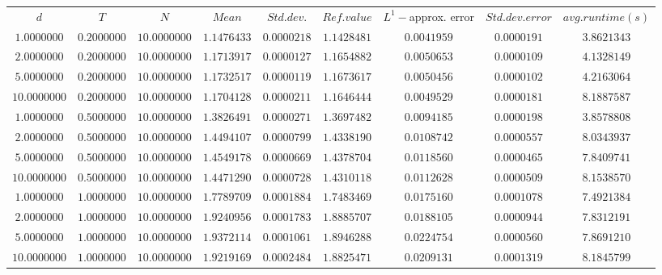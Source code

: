 \begin{tabular}{ccccccccc}
$d$ & $T$ & $N$ & $Mean$ & $Std. dev.$ & $Ref. value$ & $L^1-$approx. error & $Std. dev. error$ & $avg. runtime (s)$\\
$1.0000000$ & $0.2000000$ & $10.0000000$ & $1.1476433$ & $0.0000218$ & $1.1428481$ & $0.0041959$ & $0.0000191$ & $3.8621343$\\
$2.0000000$ & $0.2000000$ & $10.0000000$ & $1.1713917$ & $0.0000127$ & $1.1654882$ & $0.0050653$ & $0.0000109$ & $4.1328149$\\
$5.0000000$ & $0.2000000$ & $10.0000000$ & $1.1732517$ & $0.0000119$ & $1.1673617$ & $0.0050456$ & $0.0000102$ & $4.2163064$\\
$10.0000000$ & $0.2000000$ & $10.0000000$ & $1.1704128$ & $0.0000211$ & $1.1646444$ & $0.0049529$ & $0.0000181$ & $8.1887587$\\
$1.0000000$ & $0.5000000$ & $10.0000000$ & $1.3826491$ & $0.0000271$ & $1.3697482$ & $0.0094185$ & $0.0000198$ & $3.8578808$\\
$2.0000000$ & $0.5000000$ & $10.0000000$ & $1.4494107$ & $0.0000799$ & $1.4338190$ & $0.0108742$ & $0.0000557$ & $8.0343937$\\
$5.0000000$ & $0.5000000$ & $10.0000000$ & $1.4549178$ & $0.0000669$ & $1.4378704$ & $0.0118560$ & $0.0000465$ & $7.8409741$\\
$10.0000000$ & $0.5000000$ & $10.0000000$ & $1.4471290$ & $0.0000728$ & $1.4310118$ & $0.0112628$ & $0.0000509$ & $8.1538570$\\
$1.0000000$ & $1.0000000$ & $10.0000000$ & $1.7789709$ & $0.0001884$ & $1.7483469$ & $0.0175160$ & $0.0001078$ & $7.4921384$\\
$2.0000000$ & $1.0000000$ & $10.0000000$ & $1.9240956$ & $0.0001783$ & $1.8885707$ & $0.0188105$ & $0.0000944$ & $7.8312191$\\
$5.0000000$ & $1.0000000$ & $10.0000000$ & $1.9372114$ & $0.0001061$ & $1.8946288$ & $0.0224754$ & $0.0000560$ & $7.8691210$\\
$10.0000000$ & $1.0000000$ & $10.0000000$ & $1.9219169$ & $0.0002484$ & $1.8825471$ & $0.0209131$ & $0.0001319$ & $8.1845799$\\
\end{tabular}
